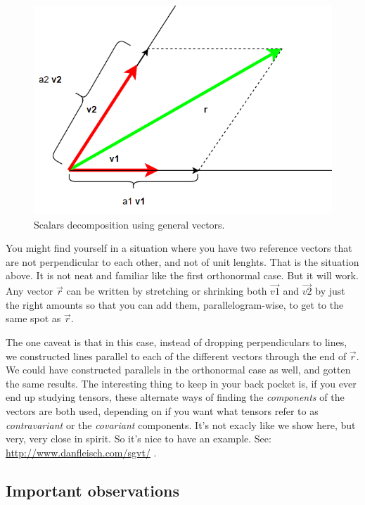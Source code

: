 \documentclass[
]{book}
\begin{document}
\begin{figure}

{\centering \includegraphics[width=0.75\linewidth,height=0.75\textheight]{images/parallelogram-decomposition} 

}

\caption{Scalars decomposition using general vectors.}\label{fig:unnamed-chunk-5}
\end{figure}

You might find yourself in a situation where you have two reference vectors that are not perpendicular to each other, and not of unit lenghts. That is the situation above. It is not neat and familiar like the first orthonormal case. But it will work. Any vector \(\vec{r}\) can be written by stretching or shrinking both \(\vec{v1}\) and \(\vec{v2}\) by just the right amounts so that you can add them, parallelogram-wise, to get to the same spot as \(\vec{r}\).

The one caveat is that in this case, instead of dropping perpendiculars to lines, we constructed lines parallel to each of the different vectors through the end of \(\vec{r}\). We could have constructed parallels in the orthonormal case as well, and gotten the same results. The interesting thing to keep in your back pocket is, if you ever end up studying tensors, these alternate ways of finding the \emph{components} of the vectors are both used, depending on if you want what tensors refer to as \emph{contravariant} or the \emph{covariant} components. It's not exacly like we show here, but very, very close in spirit. So it's nice to have an example. See: \url{http://www.danfleisch.com/sgvt/} .

\hypertarget{important-observations}{%
\subsection{Important observations}\label{important-observations}}
\end{document}
